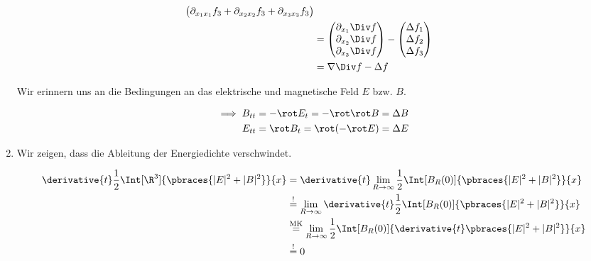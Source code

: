\begin{solution}
\begin{enumerate}[label = (\roman*)]
\begin{align*}
\begin{pmatrix}
            \partial_{x_1 x_1} f_3 + \partial_{x_2 x_2} f_3 + \partial_{x_3 x_3} f_3 \\
        \end{pmatrix} \\
        & =
        \begin{pmatrix}
            \partial_{x_1} \Div f \\
            \partial_{x_2} \Div f \\
            \partial_{x_3} \Div f
        \end{pmatrix}
        -
        \begin{pmatrix}
            \Delta f_1 \\
            \Delta f_2 \\
            \Delta f_3
        \end{pmatrix} \\
        & =
        \nabla \Div f
        -
        \Delta f
    \end{align*}

    Wir erinnern uns an die Bedingungen an das elektrische und magnetische Feld $E$ bzw. $B$.

    \begin{align*}
        \implies
        B_{tt} & = -\rot E_t = -\rot \rot B = \Delta B \\
        E_{tt} & = \rot B_t = \rot(-\rot E) = \Delta E
    \end{align*}

    \item Wir zeigen, dass die Ableitung der Energiedichte verschwindet.
    
    \begin{align*}
        \derivative{t}
        \frac{1}{2}
        \Int[\R^3]{\pbraces{|E|^2 + |B|^2}}{x}
        & =
        \derivative{t}
        \lim_{R \to \infty}
        \frac{1}{2}
        \Int[B_R(0)]{\pbraces{|E|^2 + |B|^2}}{x} \\
        & \stackrel{!}{=}
        \lim_{R \to \infty}
        \derivative{t}
        \frac{1}{2}
        \Int[B_R(0)]{\pbraces{|E|^2 + |B|^2}}{x} \\
        & \stackrel
        {
            \mathrm{MK}
        }{=}
        \lim_{R \to \infty}
        \frac{1}{2}
        \Int[B_R(0)]
        {
            \derivative{t}
            \pbraces{|E|^2 + |B|^2}
        }{x} \\
        & \stackrel{!}{=}
        0
    \end{align*}
    

\end{enumerate}
\end{solution}
